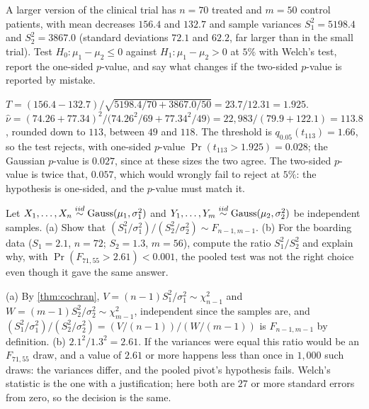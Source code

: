 \begin{exercise}
\label{ex:t-two-sample}
A larger version of the clinical trial has $n = 70$ treated and $m = 50$ control patients, with mean decreases $156.4$ and $132.7$ and sample variances $S_1^2 = 5198.4$ and $S_2^2 = 3867.0$ (standard deviations $72.1$ and $62.2$, far larger than in the small trial). Test $H_0: \mu_1 - \mu_2 \leq 0$ against $H_1: \mu_1 - \mu_2 > 0$ at $5\%$ with Welch's test, report the one-sided $p$-value, and say what changes if the two-sided $p$-value is reported by mistake.
\end{exercise}
\begin{solution}
$T = (156.4 - 132.7)/\sqrt{5198.4/70 + 3867.0/50} = 23.7/12.31 = 1.925$. $\hat{\nu} = (74.26 + 77.34)^2/\big(74.26^2/69 + 77.34^2/49\big) = 22{,}983/(79.9 + 122.1) = 113.8$, rounded down to $113$, between $49$ and $118$. The threshold is $q_{0.05}(t_{113}) = 1.66$, so the test rejects, with one-sided $p$-value $\Pr(t_{113} > 1.925) = 0.028$; the Gaussian $p$-value is $0.027$, since at these sizes the two agree. The two-sided $p$-value is twice that, $0.057$, which would wrongly fail to reject at $5\%$: the hypothesis is one-sided, and the $p$-value must match it.
\end{solution}

\begin{exercise}
\label{ex:t-fratio}
Let $X_1, \ldots, X_n \stackrel{iid}{\sim} \text{Gauss}(\mu_1, \sigma_1^2)$ and $Y_1, \ldots, Y_m \stackrel{iid}{\sim} \text{Gauss}(\mu_2, \sigma_2^2)$ be independent samples. (a) Show that $(S_1^2/\sigma_1^2)/(S_2^2/\sigma_2^2) \sim F_{n-1,m-1}$. (b) For the boarding data ($S_1 = 2.1$, $n = 72$; $S_2 = 1.3$, $m = 56$), compute the ratio $S_1^2/S_2^2$ and explain why, with $\Pr(F_{71,55} > 2.61) < 0.001$, the pooled test was not the right choice even though it gave the same answer.
\end{exercise}
\begin{solution}
(a) By \cref{thm:cochran}, $V = (n-1)S_1^2/\sigma_1^2 \sim \chi^2_{n-1}$ and $W = (m-1)S_2^2/\sigma_2^2 \sim \chi^2_{m-1}$, independent since the samples are, and $(S_1^2/\sigma_1^2)/(S_2^2/\sigma_2^2) = (V/(n-1))/(W/(m-1))$ is $F_{n-1,m-1}$ by definition. (b) $2.1^2/1.3^2 = 2.61$. If the variances were equal this ratio would be an $F_{71,55}$ draw, and a value of $2.61$ or more happens less than once in $1{,}000$ such draws: the variances differ, and the pooled pivot's hypothesis fails. Welch's statistic is the one with a justification; here both are $27$ or more standard errors from zero, so the decision is the same.
\end{solution}

